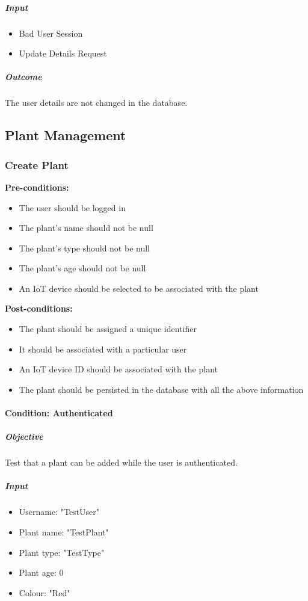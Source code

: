 \documentclass{article}
\begin{document}
				\subparagraph{Input}
					\begin{itemize}
						\item Bad User Session
						\item Update Details Request
					\end{itemize}
				
				\subparagraph{Outcome}
					The user details are not changed in the database.
	
	\subsection{Plant Management}
		\subsubsection{Create Plant}
		
		\textbf{Pre-conditions:}
		\begin{itemize}
			\item The user should be logged in
			\item The plant's name should not be null
			\item The plant's type should not be null
			\item The plant's age should not be null
			\item An IoT device should be selected to be associated with the plant
		\end{itemize}
		\textbf{Post-conditions:}
		\begin{itemize}
			\item The plant should be assigned a unique identifier
			\item It should be associated with a particular user
			\item An IoT device ID should be associated with the plant
			\item The plant should be persisted in the database with all the above information
		\end{itemize}
			
		\paragraph{Condition: Authenticated}
		\subparagraph{Objective}
		Test that a plant can be added while the user is authenticated.
		
		\subparagraph{Input}
		\begin{itemize}
			\item Username: "TestUser"
			\item Plant name: "TestPlant"
			\item Plant type: "TestType"
			\item Plant age: 0
			\item Colour: "Red"
		\end{itemize}
		
\end{document}
